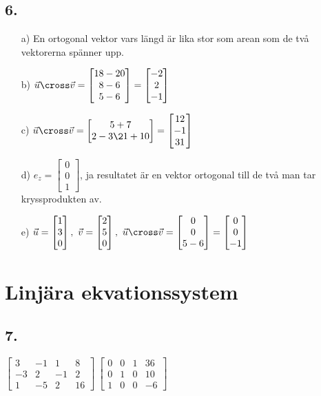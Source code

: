 \documentclass{article}
\begin{document}
\subsection*{6.}
\begin{itemize}
	\item[a) ] En ortogonal vektor vars längd är lika stor som arean som de två vektorerna spänner upp.
	\item[b) ] $\vec{u}\cross \vec{v}=\begin{bmatrix}18-20\\8-6\\5-6\end{bmatrix}=\begin{bmatrix}-2\\2\\-1\end{bmatrix}$
	\item[c) ] $\vec{u}\cross \vec{v}=\begin{bmatrix}5+7\\2-3\21+10\end{bmatrix}=\begin{bmatrix}12\\-1\\31\end{bmatrix}$
	\item[d) ] $e_z=\begin{bmatrix}0\\0\\1\end{bmatrix}$, ja resultatet är en vektor ortogonal till de två man tar kryssprodukten av.
	\item[e) ] $\vec{u}=\begin{bmatrix}1\\3\\0\end{bmatrix},\ \vec{v}=\begin{bmatrix}2\\5\\0\end{bmatrix},\ 
	\vec{u}\cross \vec{v}=\begin{bmatrix}0\\0\\5-6\end{bmatrix}=\begin{bmatrix}0\\0\\-1\end{bmatrix}$
\end{itemize}

\section*{Linjära ekvationssystem}
\subsection*{7.}
$\begin{bmatrix}
3 &-1 &1 & 8 \\
-3 &2 &-1 &2 \\
1 &-5 &2 & 16
\end{bmatrix}~
\begin{bmatrix}
0 &0 &1 &36\\
0 &1 &0 &10\\
1 &0 &0 &-6
\end{bmatrix}$
\end{document}
